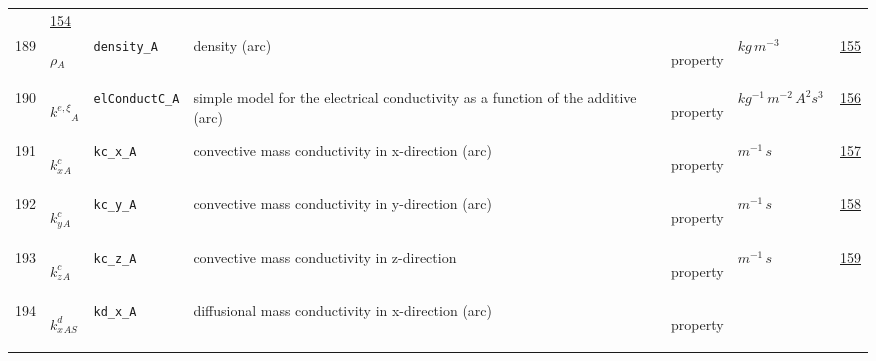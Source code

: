 \begin{longtable}{|p{1cm}|p{2.5cm}|p{4.5cm}|p{8cm}|p{3.0cm}|p{3cm}|p{1cm}|}
             &                 \hyperlink{"e:154"}{ 154 }
                 \\
            189
             & \hypertarget{"v:189"}{ $ {\rho}{_{A}} $}
             & \verb|density_A|
             & density (arc)
             & \begin{lay}property \end{lay}
             & $ kg \,m^{-3} \, $
             &                 \hyperlink{"e:155"}{ 155 }
                 \\
            190
             & \hypertarget{"v:190"}{ $ {{k^{e,\xi}}}{_{A}} $}
             & \verb|elConductC_A|
             & simple model for the electrical conductivity as a function of the additive (arc)
             & \begin{lay}property \end{lay}
             & $ kg^{-1} \,m^{-2} \,A^{2} s^{3} \, $
             &                 \hyperlink{"e:156"}{ 156 }
                 \\
            191
             & \hypertarget{"v:191"}{ $ {{k^c_x}}{_{A}} $}
             & \verb|kc_x_A|
             & convective mass conductivity in x-direction (arc)
             & \begin{lay}property \end{lay}
             & $ m^{-1} \,s \, $
             &                 \hyperlink{"e:157"}{ 157 }
                 \\
            192
             & \hypertarget{"v:192"}{ $ {{k^c_y}}{_{A}} $}
             & \verb|kc_y_A|
             & convective mass conductivity in y-direction (arc)
             & \begin{lay}property \end{lay}
             & $ m^{-1} \,s \, $
             &                 \hyperlink{"e:158"}{ 158 }
                 \\
            193
             & \hypertarget{"v:193"}{ $ {{k^c_z}}{_{A}} $}
             & \verb|kc_z_A|
             & convective mass conductivity in z-direction
             & \begin{lay}property \end{lay}
             & $ m^{-1} \,s \, $
             &                 \hyperlink{"e:159"}{ 159 }
                 \\
            194
             & \hypertarget{"v:194"}{ $ {{k^d_x}}{_{{A S}}} $}
             & \verb|kd_x_A|
             & diffusional mass conductivity in x-direction (arc)
             & \begin{lay}property \end{lay}

\end{longtable}
